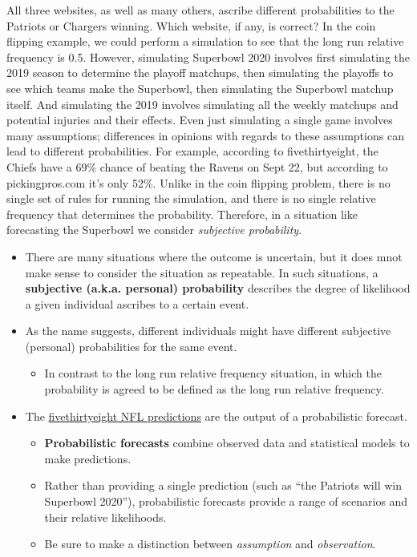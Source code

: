 \documentclass[
]{book}
\providecommand{\tightlist}{%
  \setlength{\itemsep}{0pt}\setlength{\parskip}{0pt}}
\theoremstyle{definition}
\theoremstyle{definition}
\theoremstyle{definition}
\theoremstyle{remark}
\begin{document}
All three websites, as well as many others, ascribe different probabilities to the Patriots or Chargers winning. Which website, if any, is correct? In the coin flipping example, we could perform a simulation to see that the long run relative frequency is 0.5. However, simulating Superbowl 2020 involves first simulating the 2019 season to determine the playoff matchups, then simulating the playoffs to see which teams make the Superbowl, then simulating the Superbowl matchup itself. And simulating the 2019 involves simulating all the weekly matchups and potential injuries and their effects. Even just simulating a single game involves many assumptions; differences in opinions with regards to these assumptions can lead to different probabilities. For example, according to fivethirtyeight, the Chiefs have a 69\% chance of beating the Ravens on Sept 22, but according to pickingpros.com it's only 52\%. Unlike in the coin flipping problem, there is no single set of rules for running the simulation, and there is no single relative frequency that determines the probability. Therefore, in a situation like forecasting the Superbowl we consider \emph{subjective probability}.

\begin{itemize}
\tightlist
\item
  There are many situations where the outcome is uncertain, but it does mnot make sense to consider the situation as repeatable. In such situations, a \textbf{subjective (a.k.a. personal) probability} describes the degree of likelihood a given individual ascribes to a certain event.
\item
  As the name suggests, different individuals might have different subjective (personal) probabilities for the same event.

  \begin{itemize}
  \tightlist
  \item
    In contrast to the long run relative frequency situation, in which the probability is agreed to be defined as the long run relative frequency.
  \end{itemize}
\item
  The \href{https://fivethirtyeight.com/methodology/how-our-nfl-predictions-work/}{fivethirtyeight NFL predictions} are the output of a probabilistic forecast.

  \begin{itemize}
  \tightlist
  \item
    \textbf{Probabilistic forecasts} combine observed data and statistical models to make predictions.
  \item
    Rather than providing a single prediction (such as ``the Patriots will win Superbowl 2020''), probabilistic forecasts provide a range of scenarios and their relative likelihoods.
  \item
    Be sure to make a distinction between \emph{assumption} and \emph{observation}.
  \end{itemize}
\end{itemize}
\end{document}
